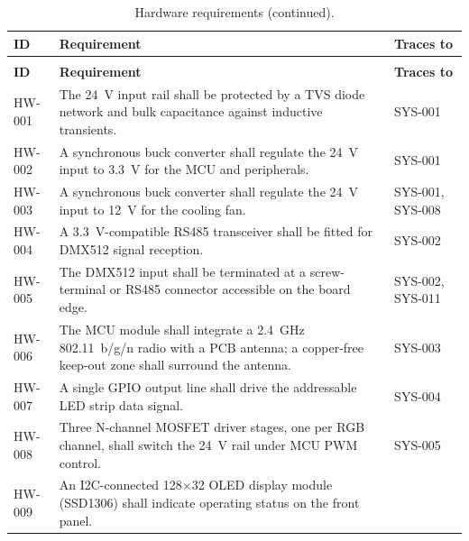 \begin{longtable}{|p{1.8cm}|p{\dimexpr\linewidth-5.8cm-6\tabcolsep-4\arrayrulewidth\relax}|p{4cm}|}
  \caption{Hardware requirements derived from system requirements.}\label{tab:req_hardware} \\
  \hline
  \textbf{ID} & \textbf{Requirement} & \textbf{Traces to} \\ \hline \hline
  \endfirsthead
  \caption[]{Hardware requirements (continued).} \\
  \hline
  \textbf{ID} & \textbf{Requirement} & \textbf{Traces to} \\ \hline \hline
  \endhead
  \hline
  \endfoot
    \label{req:hw001}HW-001 &
      The \SI{24}{\volt} input rail shall be protected by a \ac{TVS} diode network and bulk capacitance against inductive transients. &
      SYS-001 \\ \hline
    \label{req:hw002}HW-002 &
      A synchronous buck converter shall regulate the \SI{24}{\volt} input to \SI{3.3}{\volt} for the \ac{MCU} and peripherals. &
      SYS-001 \\ \hline
    \label{req:hw003}HW-003 &
      A synchronous buck converter shall regulate the \SI{24}{\volt} input to \SI{12}{\volt} for the cooling fan. &
      SYS-001, SYS-008 \\ \hline
    \label{req:hw004}HW-004 &
      A \SI{3.3}{\volt}-compatible \ac{RS485} transceiver shall be fitted for \ac{DMX}512 signal reception. &
      SYS-002 \\ \hline
    \label{req:hw005}HW-005 &
      The \ac{DMX}512 input shall be terminated at a screw-terminal or \ac{RS485} connector accessible on the board edge. &
      SYS-002, SYS-011 \\ \hline
    \label{req:hw006}HW-006 &
      The \ac{MCU} module shall integrate a \SI{2.4}{\giga\hertz} 802.11~b/g/n radio with a \ac{PCB} antenna; a copper-free keep-out zone shall surround the antenna. &
      SYS-003 \\ \hline
    \label{req:hw007}HW-007 &
      A single \ac{GPIO} output line shall drive the addressable \ac{LED} strip data signal. &
      SYS-004 \\ \hline
    \label{req:hw008}HW-008 &
      Three N-channel \ac{MOSFET} driver stages, one per \ac{RGB} channel, shall switch the \SI{24}{\volt} rail under \ac{MCU} \ac{PWM} control. &
      SYS-005 \\ \hline
    \label{req:hw009}HW-009 &
      An \ac{I2C}-connected 128$\times$32 \ac{OLED} display module (SSD1306) shall indicate operating status on the front panel. &

\end{longtable}
